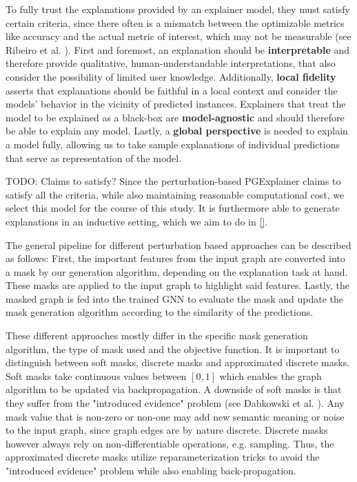 To fully trust the explanations provided by an explainer model, they must satisfy certain criteria, since there often is a mismatch between the optimizable metrics like accuracy and the actual metric of interest, which may not be measurable (see Ribeiro et al. \cite{ribeiro2016should}). First and foremost, an explanation should be \textbf{interpretable} and therefore provide qualitative, human-understandable interpretations, that also consider the possibility of limited user knowledge. Additionally, \textbf{local fidelity} asserts that explanations should be faithful in a local context and consider the models' behavior in the vicinity of predicted instances. Explainers that treat the model to be explained as a black-box are \textbf{model-agnostic} and should therefore be able to explain any model. Lastly, a \textbf{global perspective} is needed to explain a model fully, allowing us to take sample explanations of individual predictions that serve as representation of the model.

TODO: Claims to satisfy?
Since the perturbation-based PGExplainer \cite{luo2020parameterized} claims to satisfy all the criteria, while also maintaining reasonable computational cost, we select this model for the course of this study. It is furthermore able to generate explanations in an inductive setting, which we aim to do in \ref{}.

The general pipeline for different perturbation based approaches can be described as follows: First, the important features from the input graph are converted into a mask by our generation algorithm, depending on the explanation task at hand. These masks are applied to the input graph to highlight said features. Lastly, the masked graph is fed into the trained GNN to evaluate the mask and update the mask generation algorithm according to the similarity of the predictions. 

These different approaches mostly differ in the specific mask generation algorithm, the type of mask used and the objective function. It is important to distinguish between soft masks, discrete masks and approximated discrete masks. Soft masks take continuous values between $[0,1]$ which enables the graph algorithm to be updated via backpropagation. A downside of soft masks is that they suffer from the "introduced evidence" problem (see Dabkowski et al. \cite{dabkowski2017real}). Any mask value that is non-zero or non-one may add new semantic meaning or noise to the input graph, since graph edges are by nature discrete. Discrete masks however always rely on non-differentiable operations, e.g. sampling. Thus, the approximated discrete masks utilize reparameterization tricks to avoid the "introduced evidence" problem while also enabling back-propagation. %

